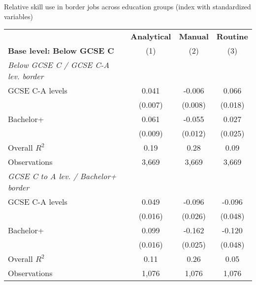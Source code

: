 \begin{center}
\begin{threeparttable}[!h]
\caption{Relative skill use in border jobs across education groups (index with standardized variables)}
\label{tab:skillRegs}
\begin{tabular}{lccc}
\toprule
\toprule
&\multicolumn{1}{c}{\textbf{Analytical}}&\multicolumn{1}{c}{\textbf{Manual}}&\multicolumn{1}{c}{\textbf{Routine}} \\
\textbf{Base level: Below GCSE C}&\multicolumn{1}{c}{(1)}&\multicolumn{1}{c}{(2)}&\multicolumn{1}{c}{(3)} \\
\midrule
\midrule\textit{Below GCSE C / GCSE C-A lev. border}\vspace{1mm} \\ 
\hspace{3mm}GCSE C-A levels&       0.041\sym{***}&      -0.006         &       0.066\sym{***}\\
                    &     (0.007)         &     (0.008)         &     (0.018)         \\
\hspace{3mm}Bachelor+&       0.061\sym{***}&      -0.055\sym{***}&       0.027         \\
                    &     (0.009)         &     (0.012)         &     (0.025)         \\
\midrule Overall $ R^2$&        0.19         &        0.28         &        0.09         \\
Observations        &       3,669         &       3,669         &       3,669         \\
\midrule\textit{GCSE C to A lev. / Bachelor+ border}\vspace{1mm} \\ 
\hspace{3mm}GCSE C-A levels&       0.049\sym{**} &      -0.096\sym{***}&      -0.096\sym{*}  \\
                    &     (0.016)         &     (0.026)         &     (0.048)         \\
\hspace{3mm}Bachelor+&       0.099\sym{***}&      -0.162\sym{***}&      -0.120\sym{*}  \\
                    &     (0.016)         &     (0.025)         &     (0.048)         \\
\midrule Overall $ R^2$&        0.11         &        0.26         &        0.05         \\
Observations        &       1,076         &       1,076         &       1,076         \\

\end{tabular}
\end{threeparttable}
\end{center}
